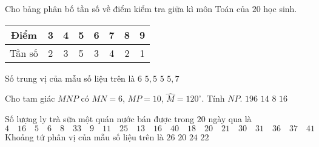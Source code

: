 \begin{ex}%
	Cho bảng phân bố tần số về điểm kiểm tra giữa kì môn Toán của $20$ học sinh.
\begin{center}
		\begin{tabular}{|c|c|c|c|c|c|c|c|}
		\hline
		Điểm & 3 & 4 & 5 & 6 & 7 & 8 & 9 \\
		\hline
		Tần số & 2 & 3 & 5 & 3 & 4 & 2 & 1 \\
		\hline
	\end{tabular}
\end{center}
Số trung vị của mẫu số liệu trên là
	\choice
	{$6$}
	{\True $5{,}5$}
	{$5$}
	{$5{,}7$}
\end{ex}

\begin{ex}%
	Cho tam giác $MNP$ có $MN=6$, $MP=10$, $\widehat{M}=120^{\circ}$. Tính $NP$.
	\choice
	{$196$}
	{\True $14$}
	{$8$}
	{$16$}
\end{ex}

\begin{ex}%
	Số lượng ly trà sữa một quán nước bán được trong $20$ ngày qua là 
	\[ 4 \quad 16 \quad 5 \quad 6 \quad 8 \quad 33 \quad 9 \quad 11 \quad 25 \quad 13 \quad 16 \quad 40 \quad 18 \quad 20 \quad 21 \quad 30 \quad 31 \quad 36 \quad 37 \quad 41\]
	Khoảng tứ phân vị của mẫu số liệu trên là
	\choice
	{$26$}
	{$20$}
	{$24$}
	{\True $22$}
\end{ex}



